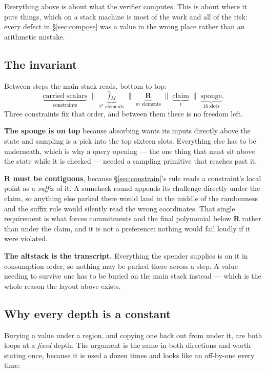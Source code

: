 \documentclass[11pt,a4paper]{article}
\begin{document}
Everything above is about what the verifier computes. This is about where it puts things, which on a
stack machine is most of the work and all of the risk: every defect in \S\ref{sec:compose} was a
value in the wrong place rather than an arithmetic mistake.

\subsection*{The invariant}

Between steps the main stack reads, bottom to top:
\[
  \underbrace{\text{carried scalars}}_{\text{constraints}}
  \;\|\;
  \underbrace{\hat f_{M}}_{2^{v}\text{ elements}}
  \;\|\;
  \underbrace{\boldsymbol R}_{m\text{ elements}}
  \;\|\;
  \underbrace{\text{claim}}_{1}
  \;\|\;
  \underbrace{\text{sponge}}_{16\text{ slots}} .
\]
Three constraints fix that order, and between them there is no freedom left.

\smallskip
\noindent\textbf{The sponge is on top} because absorbing wants its inputs directly above the state
and sampling is a pick into the top sixteen slots. Everything else has to be underneath, which is why
a query opening --- the one thing that must sit above the state while it is checked --- needed a
sampling primitive that reaches past it.

\smallskip
\noindent\textbf{$\boldsymbol R$ must be contiguous}, because \S\ref{sec:constrain}'s rule reads a
constraint's local point as a \emph{suffix} of it. A sumcheck round appends its challenge directly
under the claim, so anything else parked there would land in the middle of the randomness and the
suffix rule would silently read the wrong coordinates. That single requirement is what forces
commitments and the final polynomial below $\boldsymbol R$ rather than under the claim, and it is not
a preference: nothing would fail loudly if it were violated.

\smallskip
\noindent\textbf{The altstack is the transcript.} Everything the spender supplies is on it in
consumption order, so nothing may be parked there across a step. A value needing to survive one has
to be buried on the main stack instead --- which is the whole reason the layout above exists.

\subsection*{Why every depth is a constant}

Burying a value under a region, and copying one back out from under it, are both loops at a
\emph{fixed} depth. The argument is the same in both directions and worth stating once, because it is
used a dozen times and looks like an off-by-one every time:
\end{document}
